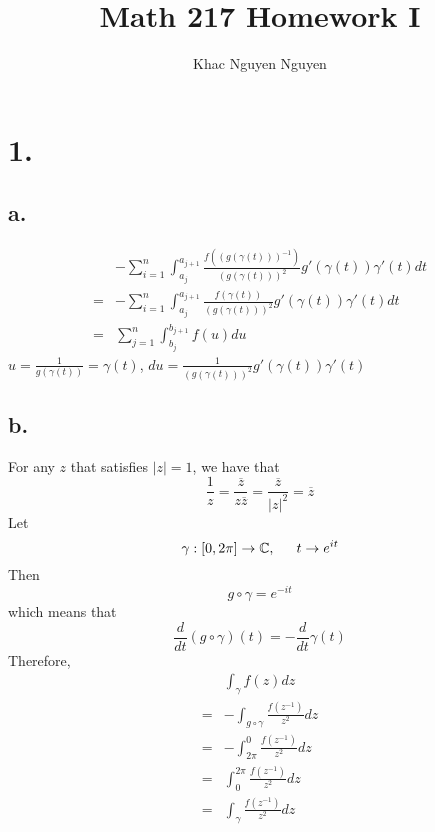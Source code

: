 \documentclass[11pt]{article}
\title{\textbf{Math 217 Homework I}}
\author{Khac Nguyen Nguyen}
\date{}
\begin{document}
\section*{1.}
\subsection*{a.}
\begin{equation*}
    \begin{aligned}
        &- \sum_{i=1}^n \int_{a_j}^{a_{j+1}} \frac{f((g(\gamma(t)))^{-1})}{(g(\gamma(t)))^2} g'(\gamma(t)) \gamma'(t) dt \\
        =& - \sum_{i=1}^n \int_{a_j}^{a_{j+1}} \frac{f(\gamma(t))}{(g(\gamma(t)))^2} g'(\gamma(t)) \gamma'(t) dt\\
        =& \sum_{j=1}^n \int_{b_j}^{b_{j+1}} f(u)du
    \end{aligned}
\end{equation*}
$u = \frac{1}{g(\gamma(t))} = \gamma(t)$, $du = \frac{1}{(g(\gamma(t)))^2} g'(\gamma(t)) \gamma'(t)$
\subsection*{b.}
For any $z$ that satisfies $|z| = 1$, we have that 
\[
    \frac{1}{z} = \frac{\overline{z}}{z\overline{z}} = \frac{\overline{z}}{|z|^2} = \overline{z}
\]
Let 
\[
    \gamma: [0,2\pi] \to \mathbb{C}, \indent t \to e^{it}    
\]
Then 
\[
    g \circ \gamma = e^{-it}
\]
which means that 
\[
    \frac{d}{dt}(g \circ \gamma)(t) = - \frac{d}{dt} \gamma(t)
\]
Therefore, 
\begin{equation*}
    \begin{aligned}
        &\int_{\gamma} f(z) dz \\
        =& - \int_{g \circ \gamma} \frac{f(z^{-1})}{z^2} dz \\
        =& - \int_{2\pi}^0 \frac{f(z^{-1})}{z^2}  dz \\
        =& \int_0^{2\pi} \frac{f(z^{-1})}{z^2} dz \\
        =& \int_\gamma \frac{f(z^{-1})}{z^2} dz
    \end{aligned}
\end{equation*}
\newpage
\end{document}
